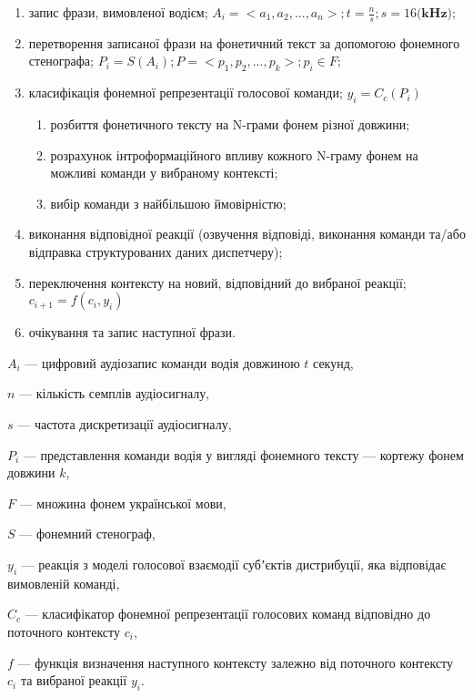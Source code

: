 \begin{enumerate}
	\item запис фрази, вимовленої водієм; $A_i=<a_1,a_2,...,a_n>; t=\frac{n}{s}; s=16 \textbf{(kHz)};$
	\item перетворення записаної фрази на фонетичний текст за допомогою фонемного стенографа; $P_i=S(A_i); P=<p_1,p_2,...,p_k>; p_i \in F;$
	\item класифікація фонемної репрезентації голосової команди; $y_i=C_c(P_i)$
	\begin{enumerate}
		\item розбиття фонетичного тексту на N-грами фонем різної довжини;
		\item розрахунок інтроформаційного впливу кожного N-граму фонем на можливі команди у вибраному контексті;
		\item вибір команди з найбільшою ймовірністю;
	\end{enumerate}
	\item виконання відповідної реакції (озвучення відповіді, виконання команди та/або відправка структурованих даних диспетчеру);
	\item переключення контексту на новий, відповідний до вибраної реакції; $c_{i+1} = f(c_i, y_i)$
	\item очікування та запис наступної фрази.
\end{enumerate}

{\settowidth{\leftskip}{Де:\ }
	
	$A_i$ --- цифровий аудіозапис команди водія довжиною $t$ секунд,
	
	$n$ --- кількість семплів аудіосигналу,
	
	$s$ --- частота дискретизації аудіосигналу,
	
	$P_i$ --- представлення команди водія у вигляді фонемного тексту --- кортежу фонем довжини $k$,
	
	$F$ --- множина фонем української мови,
	
	$S$ --- фонемний стенограф,
	
	$y_i$ --- реакція з моделі голосової взаємодії субʼєктів дистрибуції, яка відповідає вимовленій команді,
	
	$C_c$ --- класифікатор фонемної репрезентації голосових команд відповідно до поточного контексту $c_i$,
	
	$f$ --- функція визначення наступного контексту залежно від поточного контексту $c_i$ та вибраної реакції $y_i$.
	
}

